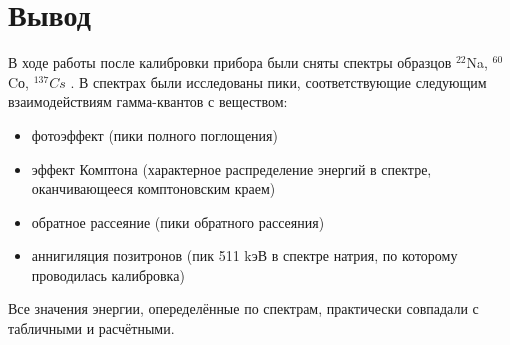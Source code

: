 \documentclass[a4paper,12pt]{article} %
\begin{document}
	\section{Вывод}
	В ходе работы после калибровки прибора были сняты спектры образцов $^{22}$Na,  $^{60}$Cо,  $^{137}Cs$ . В спектрах были исследованы пики, соответствующие следующим взаимодействиям гамма-квантов с веществом:
	\begin{itemize}
		\item фотоэффект (пики полного поглощения)
		\item эффект Комптона (характерное распределение энергий в спектре, оканчивающееся комптоновским краем)
		\item обратное рассеяние (пики обратного рассеяния)
		\item аннигиляция позитронов (пик 511 kэВ в спектре натрия, по которому проводилась калибровка)
	\end{itemize}
	
	Все значения энергии, опеределённые по спектрам, практически совпадали с табличными и расчётными. \par
	
\end{document}
